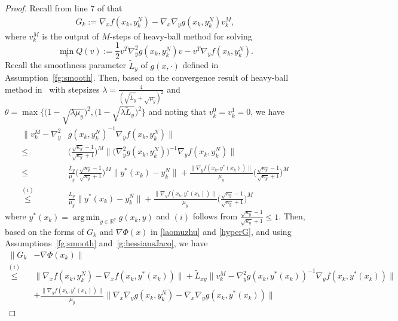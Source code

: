 \documentclass{osudissert96}
\DeclareMathOperator*{\argmin}{arg\,min}
\begin{document}
\begin{proof}
Recall from line $7$ of  that 
\begin{align}\label{laomuzhu}
G_k:= \nabla_x f(x_k,y_k^N) -\nabla_x \nabla_y g( x_k,y_k^N)v_k^M,
\end{align}
where $v_k^M$ is the output of $M$-steps of heavy-ball method for solving $$\min_v Q(v):=\frac{1}{2}v^T\nabla_y^2 g(x_k,y_k^N) v - v^T
\nabla_y f( x_k,y^N_k).$$
Recall the smoothness parameter $\widetilde L_y$ of $g(x,\cdot)$ defined in Assumption~\ref{fg:smooth}. 
Then, based on the convergence result of heavy-ball method in~\cite{badithela2019analysis} with stepsizes $\lambda=\frac{4}{(\sqrt{\widetilde L_y}+\sqrt{\mu_y})^2}$ and $\theta=\max\big\{\big(1-\sqrt{\lambda\mu_y}\big)^2,\big(1-\sqrt{\lambda\widetilde L_y}\big)^2\big\}$ and noting that $v_k^0=v_k^1=0$, we have 
\begin{align}\label{gg:worimass}
\|v_k^M - \nabla_y^2 &g(x_k,y_k^N)^{-1}\nabla_y f( x_k,y^N_k) \| \nonumber
\\\leq  &\Big(\frac{\sqrt{\kappa_y}-1}{\sqrt{\kappa_y}+1}\Big)^M \Big\| \big(\nabla_y^2 g(x_k,y_k^N)\big)^{-1}\nabla_y f(x_k,y^N_k)\Big\| \nonumber
\\\leq &\frac{L_y}{\mu_y}\Big(\frac{\sqrt{\kappa_y}-1}{\sqrt{\kappa_y}+1}\Big)^M \|y^*(x_k)-y_k^N\|  + \frac{\|\nabla_y f( x_k,y^*(x_k))\|}{\mu_y}\Big(\frac{\sqrt{\kappa_y}-1}{\sqrt{\kappa_y}+1}\Big)^M \nonumber
\\\overset{(i)}\leq &\frac{L_y}{\mu_y} \|y^*(x_k)-y_k^N\|  + \frac{\|\nabla_y f( x_k,y^*(x_k))\|}{\mu_y}\Big(\frac{\sqrt{\kappa_y}-1}{\sqrt{\kappa_y}+1}\Big)^M
\end{align}
where $y^*(x_k)=\argmin_{y\in\mathbb{R}^q} g( x_k,y)$ and $(i)$ follows from $\frac{\sqrt{\kappa_y}-1}{\sqrt{\kappa_y}+1}\leq 1$. 
 Then, based on the forms of $G_k$ and $\nabla\Phi(x)$ in \cref{laomuzhu} and \cref{hyperG}, and using Assumptions~\ref{fg:smooth} and~\ref{g:hessiansJaco}, we have 
 {\small
\begin{align}\label{jingyikeai}
\|G_k&-\nabla \Phi(x_k)\|\nonumber
\\\overset{(i)}\leq & \| \nabla_x f( x_k,y_k^N) -\nabla_x f( x_k,y^*(x_k))\| + \widetilde L_{xy}\|v_k^M- \nabla_y^2 g(x_k,y^*(x_k))^{-1}\nabla_y f(x_k,y^*(x_k)) \|  \nonumber
\\&+\frac{\|\nabla_y f( x_k,y^*(x_k)) \|}{\mu_y}  \|\nabla_x \nabla_y g( x_k,y_k^N)-\nabla_x \nabla_y g( x_k,y^*(x_k))\| \nonumber

\end{align}}
\end{proof}
\end{document}
